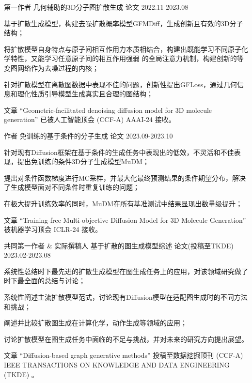 \begin{cventries}
\cventry
{第一作者} %
{几何辅助的3D分子图扩散生成} %
{论文} %
{2022.11-2023.08} %
{
  \begin{cvitems} 
    \item {基于扩散生成模型，构建去噪扩散概率模型GFMDiff，生成创新且有效的3D分子结构；}
    \item {将扩散模型自身特点与原子间相互作用力本质相结合，构建出既能学习不同原子化学特性，又能学习任意原子间的相互作用强弱
    的全局注意力机制，构建创新的等变图网络作为去噪过程的内核；}
    \item {针对扩散模型在离散图数据中表现不佳的问题，创新性提出GFLoss，通过几何信息和理化性质引导模型生成真实且合理的图结构；}
    \item {文章 “Geometric-facilitated denoising diffusion model for 3D molecule generation” 已被人工智能顶会 (CCF-A) AAAI-24 接收。}
  \end{cvitems}
}
\cventry
{作者} %
{免训练的基于条件的分子生成} %
{论文} %
{2023.09-2023.10} %
{
  \begin{cvitems} %
    \item {针对现有Diffusion框架在基于条件的生成任务中表现出的低效，不灵活和不佳表现，提出免训练的条件3D分子生成模型MuDM；}
    \item {提出对条件函数梯度进行MC采样，并最大化最终预测结果的条件期望分布，解决了生成模型面对不同条件时重复训练的问题；}
    \item {在极大提升训练效率的同时，MuDM在所有基准测试中结果显现出数量级提升；}
    \item {文章 “Training-free Multi-objective Diffusion Model for 3D Molecule Generation” 被机器学习顶会 ICLR-24 接收。}   
  \end{cvitems}
}
\cventry
{共同第一作者 \& 实际撰稿人} %
{基于扩散的图生成模型综述} %
{论文(投稿至TKDE)} %
{2023.02-2023.08} %
{
  \begin{cvitems} 
    \item {系统性总结时下最先进的扩散生成模型在图生成任务上的应用，对该领域研究做了时下最全面的总结与讨论；}
    \item {系统性阐述主流扩散模型范式，讨论现有Diffusion模型在适配图生成时的不同方法和挑战；}
    \item {阐述并比较扩散图生成在计算化学，动作生成等领域的应用；}
    \item {讨论扩散模型在图生成任务中面临的不足与挑战，并对未来的研究方向提出展望。}
    \item {文章 “Diffusion-based graph generative methods” 投稿至数据挖掘顶刊 (CCF-A) IEEE TRANSACTIONS ON KNOWLEDGE AND DATA ENGINEERING (TKDE) 。}
\end{cvitems}
}


\end{cventries}
